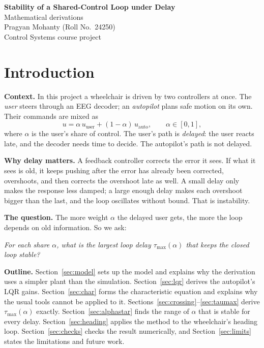 \documentclass[11pt,a4paper]{article}
\theoremstyle{definition}
\begin{document}
\begin{center}
{\LARGE\bfseries Stability of a Shared-Control Loop under Delay}\\[0.5em]
{\large Mathematical derivations}\\[0.9em]
Pragyan Mohanty \quad (Roll No.\ 24250)\\[0.2em]
Control Systems course project
\end{center}
\vspace{0.5em}

\section{Introduction}

\textbf{Context.} In this project a wheelchair is driven by two
controllers at once. The \emph{user} steers through an EEG decoder; an
\emph{autopilot} plans safe motion on its own. Their commands are mixed
as
\begin{equation}
u = \alpha\,u_{\mathrm{user}} + (1-\alpha)\,u_{\mathrm{auto}},
\qquad \alpha \in [0,1],
\label{eq:blend}
\end{equation}
where $\alpha$ is the user's share of control. The user's path is
\emph{delayed}: the user reacts late, and the decoder needs time to
decide. The autopilot's path is not delayed.

\textbf{Why delay matters.} A feedback controller corrects the error it
sees. If what it sees is old, it keeps pushing after the error has
already been corrected, overshoots, and then corrects the overshoot
late as well. A small delay only makes the response less damped; a large
enough delay makes each overshoot bigger than the last, and the loop
oscillates without bound. That is instability.

\textbf{The question.} The more weight $\alpha$ the delayed user gets,
the more the loop depends on old information. So we ask:
\begin{center}
\emph{For each share $\alpha$, what is the largest loop delay
$\tau_{\max}(\alpha)$ that keeps the closed loop stable?}
\end{center}

\textbf{Outline.}
Section~\ref{sec:model} sets up the model and explains why the
derivation uses a simpler plant than the simulation.
Section~\ref{sec:lqr} derives the autopilot's LQR gains.
Section~\ref{sec:char} forms the characteristic equation and explains
why the usual tools cannot be applied to it.
Sections~\ref{sec:crossing}--\ref{sec:taumax} derive $\tau_{\max}(\alpha)$
exactly. Section~\ref{sec:alphastar} finds the range of $\alpha$ that is
stable for every delay. Section~\ref{sec:heading} applies the method to
the wheelchair's heading loop. Section~\ref{sec:checks} checks the result
numerically, and Section~\ref{sec:limits} states the limitations and
future work.
\end{document}
